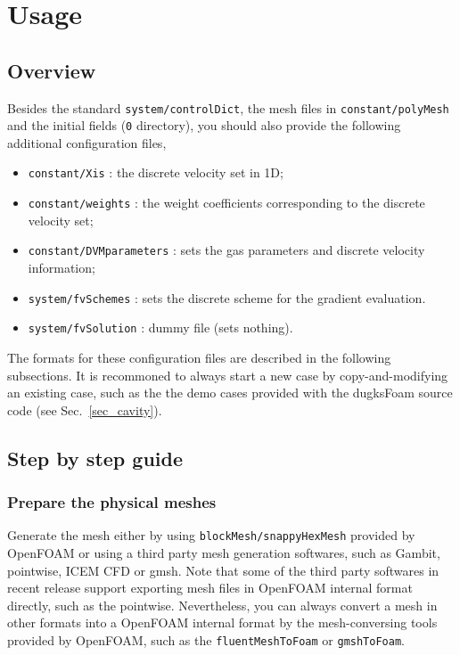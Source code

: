 

%

\chapter{Usage}

\section{Overview}

Besides the standard \texttt{system/controlDict}, the mesh files in \verb|constant/polyMesh| and the initial fields (\verb|0| directory),
you should also provide the following additional configuration files,
\begin{itemize}
\item \verb|constant/Xis| : the discrete velocity set in 1D;
\item \verb|constant/weights| : the weight coefficients corresponding to the discrete velocity set;
\item \verb|constant/DVMparameters| : sets the gas parameters and discrete velocity information;
\item \verb|system/fvSchemes| : sets the discrete scheme for the gradient evaluation.
\item \verb|system/fvSolution| : dummy file (sets nothing).
\end{itemize}
The formats for these configuration files are described in the following subsections.
It is recommoned to always start a new case by copy-and-modifying an existing case, such as the the demo cases provided with the dugksFoam source code (see Sec.~\ref{sec_cavity}).

\section{Step by step guide}
\subsection{Prepare the physical meshes}
Generate the mesh either by using \verb|blockMesh/snappyHexMesh| provided by OpenFOAM or using a third party mesh generation softwares,
such as Gambit, pointwise, ICEM CFD or gmsh.
Note that some of the third party softwares in recent release support exporting mesh files in OpenFOAM internal format directly, such as the pointwise.
Nevertheless, you can always convert a mesh in other formats into a OpenFOAM internal format by the mesh-conversing tools provided by OpenFOAM,
such as the \verb|fluentMeshToFoam| or \verb|gmshToFoam|.

